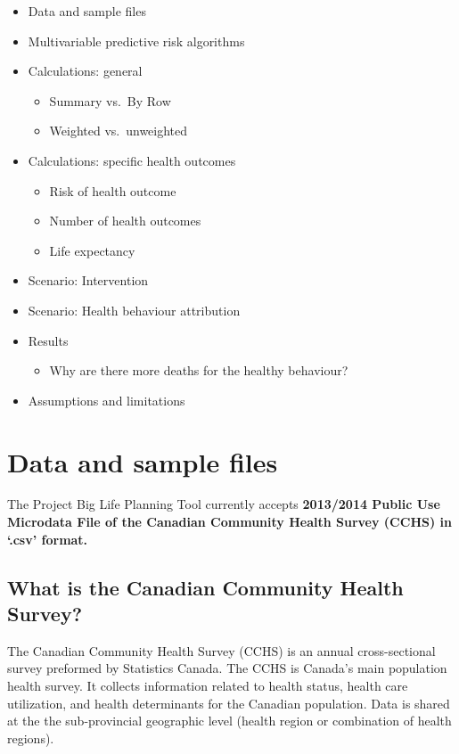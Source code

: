 \documentclass[]{book}
\providecommand{\tightlist}{%
  \setlength{\itemsep}{0pt}\setlength{\parskip}{0pt}}
\begin{document}
\begin{itemize}
\item
  Data and sample files
\item
  Multivariable predictive risk algorithms
\item
  Calculations: general

  \begin{itemize}
  \tightlist
  \item
    Summary vs.~By Row
  \item
    Weighted vs.~unweighted
  \end{itemize}
\item
  Calculations: specific health outcomes

  \begin{itemize}
  \tightlist
  \item
    Risk of health outcome
  \item
    Number of health outcomes
  \item
    Life expectancy
  \end{itemize}
\item
  Scenario: Intervention
\item
  Scenario: Health behaviour attribution
\item
  Results

  \begin{itemize}
  \tightlist
  \item
    Why are there more deaths for the healthy behaviour?
  \end{itemize}
\item
  Assumptions and limitations
\end{itemize}

\section{Data and sample files}\label{data-and-sample-files}

The Project Big Life Planning Tool currently accepts \textbf{2013/2014
Public Use Microdata File of the Canadian Community Health Survey (CCHS)
in `.csv' format.}

\subsection{What is the Canadian Community Health
Survey?}\label{what-is-the-canadian-community-health-survey}

The Canadian Community Health Survey (CCHS) is an annual cross-sectional
survey preformed by Statistics Canada. The CCHS is Canada's main
population health survey. It collects information related to health
status, health care utilization, and health determinants for the
Canadian population. Data is shared at the the sub-provincial geographic
level (health region or combination of health regions).
\end{document}
